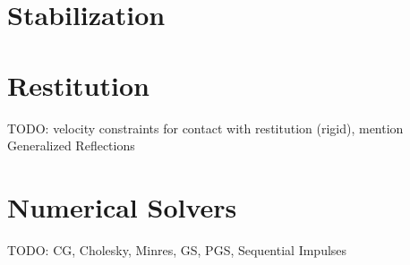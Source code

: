\documentclass{article}
\begin{document}
\section{Stabilization}
%

\section{Restitution}
%
TODO: velocity constraints for contact with restitution (rigid),
mention Generalized Reflections
%
\section{Numerical Solvers}
\label{sec:solvers}
%
TODO: CG, Cholesky, Minres, GS, PGS, Sequential Impulses
\end{document}
